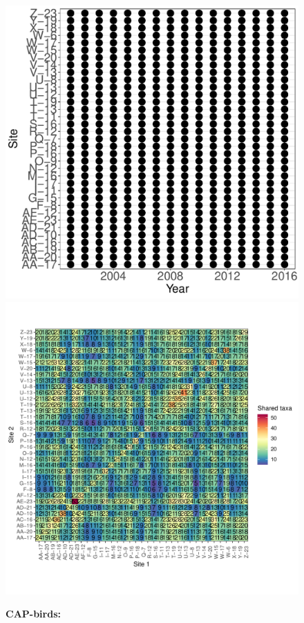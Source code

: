 \documentclass[11pt, oneside]{article}
\begin{document}
\begin{figure}[h!]
\includegraphics[scale = 0.4]{cap-birds-banville_spatiotemporal_sampling_effort.pdf}
\includegraphics[scale = 0.4]{cap-birds-banville_spp_shared.pdf}
\caption{{\bf CAP-birds:} }
\label{cap-birds}
\end{figure}
\end{document}
